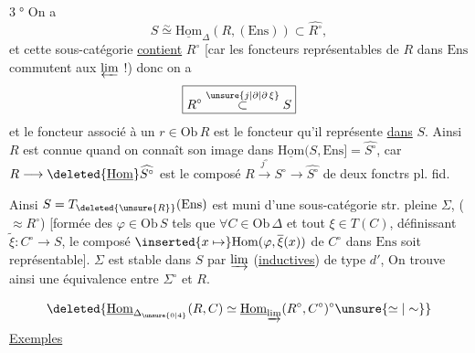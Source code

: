 \textcircled{3°} On a
\[
S\overset{\sim}{\simeq}\underline{\mathrm{Hom}}_{\Delta}(R,(\mathrm{Ens}))\subset\widehat{R^\circ},
\]
et cette sous-catégorie \uline{contient} $R^\circ$ [car les foncteurs  représentables  de $R$ dans $\mathrm{Ens}$ commutent aux $\varprojlim$ !) donc on a
\[
\boxed{R^\circ\overset{\unsure{j|\partial|\partial\,\xi}}{\subset}S}
\]
et le foncteur  associé à un $r\in\mathrm{Ob}\,R$ est le foncteur qu'il représente \uline{dans} $S$. Ainsi $R$ est connue quand on connaît son image  dans $\underline{\mathrm{Hom}}(S,\mathrm{Ens}]=\widehat{S^\circ}$, car $R\longrightarrow\deleted{\underline{\mathrm{Hom}}}\widehat{S^\circ}$ est le composé $R\xrightarrow{j^\circ}S^\circ\longrightarrow\widehat{S^\circ}$ de deux fonctrs pl. fid.

Ainsi $S=T_{\deleted{\unsure{R}}}(\mathrm{Ens})$ est muni d'une sous-catégorie str. pleine $\Sigma$, ($\approx R^\circ$) [formée des $\varphi\in\mathrm{Ob}\,S$ tels que  $\forall C\in\mathrm{Ob}\,\Delta$ et tout $\xi\in T(C)$, définissant $\widetilde\xi:C^\circ\longrightarrow S$,  le composé $\inserted{x\mapsto}\mathrm{Hom}(\varphi,\overline{\xi}(x))$ de $C^\circ$ dans $\mathrm{Ens}$ soit représentable].  $\Sigma$ est stable dans $S$ par  $\varinjlim$ (\uline{inductives}) de type $d'$,  On trouve ainsi une équivalence  entre $\Sigma^\circ$ et $R$.

\[
\deleted{\underline{\mathrm{Hom}}_{\Delta_{\unsure{0|4}}}(R,C)\simeq\underline{\mathrm{Hom}}_{\varinjlim}(R^\circ,C^\circ)^\circ\unsure{\simeq|\sim}}
\]
\uline{Exemples}


